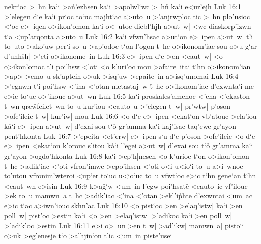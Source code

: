 nekr`oc
>~hn
ka`i
>a\r{n}'ezhsen
ka`i
>apolwl`wc
>~h\r{n}
ka`i
e<ur'ejh\bibvsend
\vs Luk 16:1
>'elegen
d`e
ka`i
pr`oc
to`uc
majht`ac
a>u\r{t}o~u
>'anjrwp'oc
tic
>~hn
plo'usioc
<`oc
e>~iqen
o>ikon'omon
ka`i
o<~utoc
diebl'hjh
a>ut~w|
<wc
diaskorp'izwn
t`a
<up'arqonta
a>uto~u\bibvsend
\vs Luk 16:2
ka`i
vfwn'hsac
a>ut`on
e>~ipen
a>ut~w|
t'i
to~uto
>ako'uw
per`i
so~u
>ap'odoc
t`on
l'ogon
t~hc
o>ikonom'iac
sou
o>u
g`ar
d'unh\r{s}h|
>'eti
o>ikonome~in\bibvsend
\vs Luk 16:3
e>~ipen
d`e
>en
<eaut~w|
<o
o>ikon'omoc
t'i
poi'hsw
<'oti
<o
k'uri'oc
mou
>afaire~itai
t`hn
o>ikonom'ian
>ap>
>emo~u
sk'aptein
o>uk
>isq'uw
>epaite~in
a>isq'unomai\bibvsend
\vs Luk 16:4
>'egnwn
t'i
poi'hsw
<'ina
<'otan
metastaj~w
\r{t}~hc
o>ikonom'iac
d'exwnta'i
me
e>ic
to`uc
o>'ikouc
a>ut~wn\bibvsend
\vs Luk 16:5
ka`i
proskales'amenoc
<'ena
<'ekaston
t~wn
qre\r{w}feilet~wn
to~u
kur'iou
<eauto~u
>'elegen
t~w|
pr'wtw|
p'oson
>ofe'ileic
t~w|
kur'iw|
mou\bibvsend
\vs Luk 16:6
<o
d`e
e>~ipen
<ekat`on
vb'atouc
>ela'iou
k\r{a}`i
e>~ipen
a>ut~w|
d'exai
sou
t`o\r{}
gr'amma
ka`i
kaj'isac
taq'ewc
gr'ayon
pent'hkonta\bibvsend
\vs Luk 16:7
>'epeita
<et'erw|
e>~ipen
s`u
d`e
p'oson
>ofe'ileic
<o
d`e
e>~ipen
<ekat`on
k'orouc
s'itou
k\r{a}`i
l'egei
a>ut~w|
d'exai
sou
t`o\r{}
gr'amma
ka`i
gr'ayon
>ogdo'hkonta\bibvsend
\vs Luk 16:8
ka`i
>ep'h|nesen
<o
k'urioc
t`on
o>ikon'omon
t~hc
>adik'iac
<'oti
vfron'imwc
>epo'ihsen
<'oti
o<i
u<io`i
to~u
a>i~wnoc
to'utou
vfronim'wteroi
<up`er
to`uc
u<io`uc
to~u
vfwt`oc
e>ic
t`hn
gene`an
\r{t}`hn
<eaut~wn
e>isin\bibvsend
\vs Luk 16:9
k>a\r{g}`w
<um~in
l'egw
poi'hsate\r{}
<eauto~ic
vf'ilouc
>ek
to~u
mamwn~a
t~hc
>adik'iac
<'ina
<'otan
>ekl'i\r{p}hte
d'exwntai
<um~ac
e>ic
t`ac
a>iwn'iouc
skhn'ac\bibvsend
\vs Luk 16:10
<o
pist`oc
>en
>elaq'istw|
ka`i
>en
poll~w|
pist'oc
>estin
ka`i
<o
>en
>elaq'istw|
>'adikoc
ka`i
>en
poll~w|
>'adik'oc
>estin\bibvsend
\vs Luk 16:11
e>i
o>~un
>en
t~w|
>ad'ikw|
mamwn~a|
pisto`i
o>uk
>eg'enesje
t`o
>alhjin`on
t'ic
<um~in
piste'usei\bibvsend

